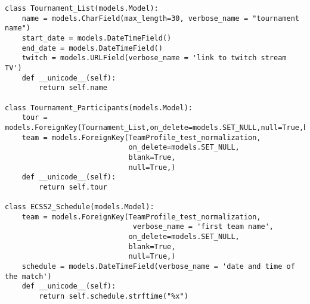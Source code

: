 \documentclass[12pt]{article}
\begin{document}
\begin{mdframed}[leftline=false, rightline=false,backgroundcolor=bg]
\begin{verbatim}
class Tournament_List(models.Model):
    name = models.CharField(max_length=30, verbose_name = "tournament name")
    start_date = models.DateTimeField()
    end_date = models.DateTimeField()
    twitch = models.URLField(verbose_name = 'link to twitch stream TV')
    def __unicode__(self):
        return self.name
        
class Tournament_Participants(models.Model):
    tour = models.ForeignKey(Tournament_List,on_delete=models.SET_NULL,null=True,blank=True)
    team = models.ForeignKey(TeamProfile_test_normalization,
                             on_delete=models.SET_NULL,
                             blank=True,
                             null=True,)
    def __unicode__(self):
        return self.tour

class ECSS2_Schedule(models.Model):
    team = models.ForeignKey(TeamProfile_test_normalization,
                              verbose_name = 'first team name', 
                             on_delete=models.SET_NULL,
                             blank=True,
                             null=True,)
    schedule = models.DateTimeField(verbose_name = 'date and time of the match')
    def __unicode__(self):
        return self.schedule.strftime("%x")

\end{verbatim}
\end{mdframed}
\end{document}
